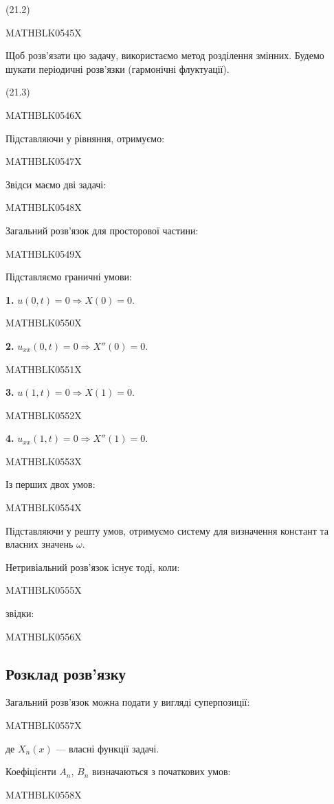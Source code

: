 \documentclass[
  ukrainian,
]{article}
\begin{document}
(21.2)

MATHBLK0545X

Щоб розв'язати цю задачу, використаємо метод розділення змінних. Будемо
шукати періодичні розв'язки (гармонічні флуктуації).

(21.3)

MATHBLK0546X

Підставляючи у рівняння, отримуємо:

MATHBLK0547X

Звідси маємо дві задачі:

MATHBLK0548X

Загальний розв'язок для просторової частини:

MATHBLK0549X

Підставляємо граничні умови:

\textbf{1.} \(u(0,t)=0 \Rightarrow X(0)=0\).

MATHBLK0550X

\textbf{2.} \(u_{xx}(0,t)=0 \Rightarrow X''(0)=0\).

MATHBLK0551X

\textbf{3.} \(u(1,t)=0 \Rightarrow X(1)=0\).

MATHBLK0552X

\textbf{4.} \(u_{xx}(1,t)=0 \Rightarrow X''(1)=0\).

MATHBLK0553X

Із перших двох умов:

MATHBLK0554X

Підставляючи у решту умов, отримуємо систему для визначення констант та
власних значень \(\omega\).

Нетривіальний розв'язок існує тоді, коли:

MATHBLK0555X

звідки:

MATHBLK0556X

\subsection{Розклад
розв'язку}\label{ux440ux43eux437ux43aux43bux430ux434-ux440ux43eux437ux432ux44fux437ux43aux443}

Загальний розв'язок можна подати у вигляді суперпозиції:

MATHBLK0557X

де \(X_n(x)\) --- власні функції задачі.

Коефіцієнти \(A_n\), \(B_n\) визначаються з початкових умов:

MATHBLK0558X
\end{document}
